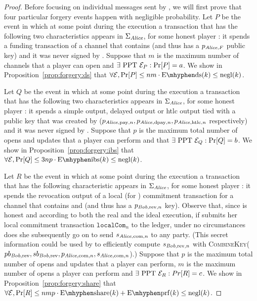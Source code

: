 \begin{proof}
  Before focusing on individual messages sent by \environment, we will first
  prove that four particular forgery events happen with negligible probability.
  Let $P$ be the event in which at some point during the execution a transaction
  that has the following two characteristics appears in $\Sigma_{\mathit{Alice}}$, for
  some honest player \alice: it spends a funding transaction of a channel that
  contains \alice{} (and thus has a $p_{\mathit{Alice}, F}$ public key) and it was never
  signed by \alice. Suppose that $m$ is the maximum number of channels that a
  player can open and $\exists \text{ PPT } \mathcal{E}_P: \Pr[P] = a$. We show
  in Proposition~\ref{prop:forgery:ds} that $\forall \environment, \Pr[P] \leq
  nm \cdot \mathrm{E \mhyphen ds}(k) \leq \negl(k)$.

  Let $Q$ be the event in which at some point during the execution a transaction
  that has the following two characteristics appears in $\Sigma_{\mathit{Alice}}$, for
  some honest player \alice: it spends a simple output, delayed output or htlc
  output tied with a public key that was created by \alice{} ($p_{\mathit{Alice},
  \mathrm{pay}, n}, p_{\mathit{Alice}, \mathrm{dpay}, n}, p_{\mathit{Alice}, \mathrm{htlc}, n}$
  respectively) and it was never signed by \alice. Suppose that $p$ is the
  maximum total number of opens and updates that a player can perform and that
  $\exists \text{ PPT } \mathcal{E}_Q: \Pr[Q] = b$. We show
  in Proposition~\ref{prop:forgery:ibs} that $\forall \environment, \Pr[Q] \leq
  3np \cdot \mathrm{E \mhyphen ibs}(k) \leq \negl(k)$.

  Let $R$ be the event in which at some point during the execution a transaction
  that has the following characteristic appears in $\Sigma_{\mathit{Alice}}$, for some
  honest player \alice: it spends the revocation output of a local (for
  \alice{}) commitment transaction for a channel that contains \alice{} and
  \bob{} (and thus has a $p_{\mathit{Bob}, \mathrm{rev}, n}$ key). Observe that, since
  \alice{} is honest and according to both the real and the ideal execution, if
  \alice{} submits her local commitment transaction $\mathtt{localCom}_n$ to the
  ledger, under no circumstances does she subsequently go on to send $s_{\mathit{Alice},
  \mathrm{com}, n}$ to any party. (This secret information could be used by
  \bob{} to efficiently compute $s_{\mathit{Bob}, \mathrm{rev}, n}$ with
  \textsc{CombineKey}($pb_{\mathit{Bob}, \mathrm{rev}}, sb_{\mathit{Bob}, \mathrm{rev}},
  p_{\mathit{Alice}, \mathrm{com}, n}, s_{\mathit{Alice}, \mathrm{com}, n}$).) Suppose that $p$
  is the maximum total number of opens and updates that a player can perform,
  $m$ is the maximum number of opens a player can perform and $\exists \text{
  PPT } \mathcal{E}_R: Pr[R] = c$. We show in
  Proposition~\ref{prop:forgery:share} that $\forall \environment, \Pr[R] \leq
  nmp \cdot \mathrm{E \mhyphen share}(k) + \mathrm{E \mhyphen prf}(k) \leq
  \negl(k)$.


\end{proof}
